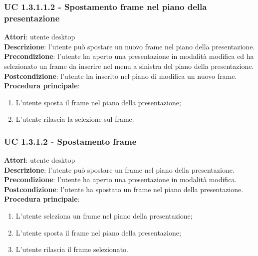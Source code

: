 \subsubsection{UC 1.3.1.1.2 - Spostamento frame nel piano della presentazione}{
	\label{uc1.3.1.1.2}
	\textbf{Attori}: utente desktop \\
	\textbf{Descrizione}: l'utente può spostare un nuovo frame nel piano della presentazione. \\
	\textbf{Precondizione}: l'utente ha aperto una presentazione in modalità modifica ed ha selezionato un frame da inserire nel menu a sinistra del piano della presentazione.	\\
	\textbf{Postcondizione}: l'utente ha inserito nel piano di modifica un nuovo frame.	\\
	\textbf{Procedura principale}:
	\begin{enumerate}
		\item L'utente sposta il frame nel piano della presentazione;
		\item L'utente rilascia la selezione sul frame.
	\end{enumerate}
	}
\subsubsection{UC 1.3.1.2 - Spostamento frame}{
	\label{uc1.3.1.2}
	\textbf{Attori}: utente desktop \\
	\textbf{Descrizione}: l'utente può spostare un frame nel piano della presentazione. \\
	\textbf{Precondizione}: l'utente ha aperto una presentazione in modalità modifica.	\\
	\textbf{Postcondizione}: l'utente ha spostato un frame nel piano della presentazione.	\\
	\textbf{Procedura principale}:
	\begin{enumerate}
		\item L'utente seleziona un frame nel piano della presentazione;
		\item L'utente sposta il frame nel piano della presentazione;
		\item L'utente rilascia il frame selezionato.
	\end{enumerate}
	}
